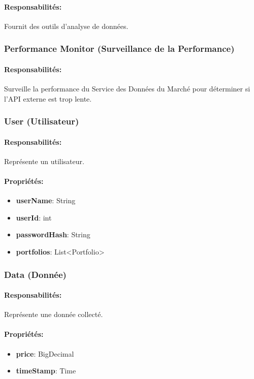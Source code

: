 \documentclass{article}
\begin{document}
\paragraph{Responsabilités:} Fournit des outils d'analyse de données.
\subsubsection{Performance Monitor (Surveillance de la Performance)}
\paragraph{Responsabilités:} Surveille la performance du Service des Données du Marché pour déterminer si l'API externe est trop lente.
\subsubsection{User (Utilisateur)}
\paragraph{Responsabilités:} Représente un utilisateur.
\paragraph{Propriétés:}
\begin{itemize}
  \item \textbf{userName}: String
  \item \textbf{userId}: int
  \item \textbf{passwordHash}: String
  \item \textbf{portfolios}: List<Portfolio>
\end{itemize}
\subsubsection{Data (Donnée)}
\paragraph{Responsabilités:} Représente une donnée collecté.
\paragraph{Propriétés:}
\begin{itemize}
  \item \textbf{price}: BigDecimal
  \item \textbf{timeStamp}: Time
\end{itemize}
\end{document}
